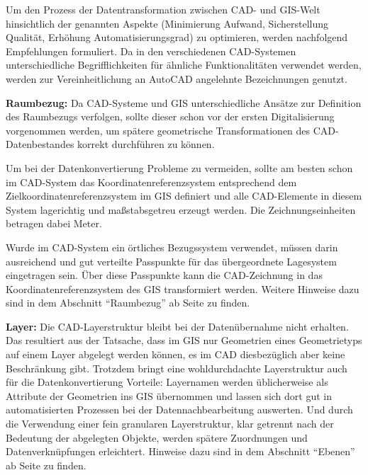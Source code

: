 Um den Prozess der Datentransformation zwischen CAD- und GIS-Welt hinsichtlich der genannten Aspekte (Minimierung Aufwand, Sicherstellung Qualität, Erhöhung Automatisierungsgrad) zu optimieren, werden nachfolgend Empfehlungen formuliert. Da in den verschiedenen CAD-Systemen unterschiedliche Begrifflichkeiten für ähnliche Funktionalitäten verwendet werden, werden zur Vereinheitlichung an AutoCAD angelehnte Bezeichnungen genutzt.

{\bfseries Raumbezug:} Da CAD-Systeme und GIS unterschiedliche Ansätze zur Definition des Raumbezugs verfolgen, sollte dieser schon vor der ersten Digitalisierung vorgenommen werden, um spätere geometrische Transformationen des CAD-Datenbestandes korrekt durchführen zu können.
 
Um bei der Datenkonvertierung Probleme zu vermeiden, sollte am besten schon im CAD-System das Koordinatenreferenzsystem entsprechend dem Zielkoordinatenreferenzsystem im GIS definiert und alle CAD-Elemente in diesem System lagerichtig und maßstabsgetreu erzeugt werden. Die Zeichnungseinheiten betragen dabei Meter.
 
Wurde im CAD-System ein örtliches Bezugssystem verwendet, müssen darin ausreichend und gut verteilte Passpunkte für das übergeordnete Lagesystem eingetragen sein. Über diese Passpunkte kann die CAD-Zeichnung in das Koordinatenreferenzsystem des GIS transformiert werden. Weitere Hinweise dazu sind in dem Abschnitt "`Raumbezug"' ab Seite \pageref{vektor_raumbezug} zu finden.

{\bfseries Layer:} Die CAD-Layerstruktur bleibt bei der Datenübernahme nicht erhalten. Das resultiert aus der Tatsache, dass im GIS nur Geometrien eines Geometrietyps auf einem Layer abgelegt werden können, es im CAD diesbezüglich aber keine Beschränkung gibt. Trotzdem bringt eine wohldurchdachte Layerstruktur auch für die Datenkonvertierung Vorteile: Layernamen werden üblicherweise als Attribute der Geometrien ins GIS übernommen und lassen sich dort gut in automatisierten Prozessen bei der Datennachbearbeitung auswerten. Und durch die Verwendung einer fein granularen Layerstruktur, klar getrennt nach der Bedeutung der abgelegten Objekte, werden spätere Zuordnungen und Datenverknüpfungen  erleichtert. Hinweise dazu sind in dem Abschnitt "`Ebenen"' ab Seite \pageref{vektor_ebenen} zu finden.

